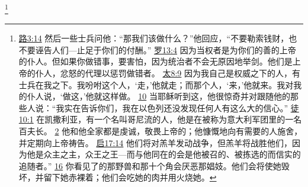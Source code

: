 \documentclass[12pt, a4paper, oneside]{ctexart}
\begin{document}
	\footnote {
		\href{https://biblehub.com/luke/3-14.htm}{路3:14} 然后一些士兵问他：“那我们该做什么？”他回应，“不要勒索钱财，也不要诬告人们---止足于你们的付酬。”
		\href{https://biblehub.com/romans/13-4.htm}{罗13:4} 因为当权者是为你们的善的上帝的仆人。但如果你做错事，要害怕，因为统治者不会无原因地举剑。他们是上帝的仆人，忿怒的代理以惩罚做错者。
		\href{https://biblehub.com/matthew/8-9.htm}{太8:9} 因为我自己是权威之下的人，有士兵在我之下。我吩咐这个人，‘走，’他就走；而那个人，‘来，’他就来。我对我的仆人说，‘做这，’他就这样做。
		\href{https://biblehub.com/matthew/8-10.htm}{10} 当耶稣听到这，他很惊奇并对跟随他的那些人说：“我实在告诉你们，我在以色列还没发现任何人有这么大的信心。”
		\href{https://biblehub.com/acts/10-1.htm}{徒10:1} 在凯撒利亚，有一个名叫哥尼流的人，他是在被称为意大利军团里的一名百夫长。
		\href{https://biblehub.com/acts/10-2.htm}{2} 他和他全家都是虔诚，敬畏上帝的；他慷慨地向有需要的人施舍，并定期向上帝祷告。
		\href{https://biblehub.com/revelation/17-14.htm}{启17:14} 他们将对羔羊发动战争，但羔羊将战胜他们，因为他是众主之主，众王之王---而与他同在的会是他被召的、被拣选的而信实的追随者。”
		\href{https://biblehub.com/revelation/17-16.htm}{16} 你看见了的那野兽和那十个角会厌恶那娼妓。他们会将使她毁坏，并留下她赤裸着；他们会吃她的肉并用火烧她。
	}
\end{document}
